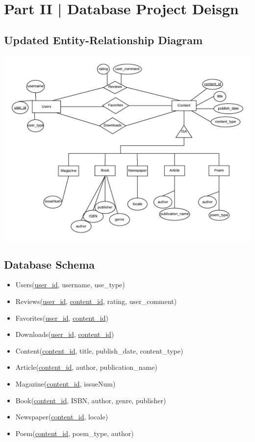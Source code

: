 \documentclass[letter, 12pt, titlepage]{article}
\begin{document}

\section{Part II | Database Project Deisgn}

\subsection{Updated Entity-Relationship Diagram}
\includegraphics[scale=1]{erd-rev.png}
\subsection{Database Schema}
\begin{itemize}
	\item Users(\underline{user\_id}, username, use\_type)
	\item Reviews(\underline{user\_id}, \underline{content\_id}, rating, user\_comment)
	\item Favorites(\underline{user\_id}, \underline{content\_id})
	\item Downloads(\underline{user\_id}, \underline{content\_id})
	\item Content(\underline{content\_id}, title, publish\_date, content\_type)
	\item Article(\underline{content\_id}, author, publication\_name)
	\item Magazine(\underline{content\_id}, issueNum)
	\item Book(\underline{content\_id}, ISBN, author, genre, publisher)
	\item Newspaper(\underline{content\_id}, locale)
	\item Poem(\underline{content\_id}, poem\_type, author)
\end{itemize}
\end{document}
